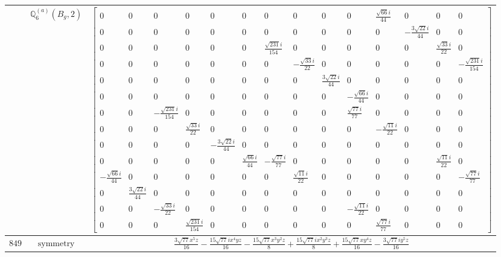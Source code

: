 \documentclass[fleqn,8pt,landscape]{jsarticle}
\begin{document}
\begin{longtable}{ccc}
$  $ & $ \mathbb{Q}_{6}^{(a)}(B_{g},2) $ & $ \begin{bmatrix} 0 & 0 & 0 & 0 & 0 & 0 & 0 & 0 & 0 & 0 & \frac{\sqrt{66} i}{44} & 0 & 0 & 0 \\ 0 & 0 & 0 & 0 & 0 & 0 & 0 & 0 & 0 & 0 & 0 & - \frac{3 \sqrt{22} i}{44} & 0 & 0 \\ 0 & 0 & 0 & 0 & 0 & 0 & \frac{\sqrt{231} i}{154} & 0 & 0 & 0 & 0 & 0 & \frac{\sqrt{33} i}{22} & 0 \\ 0 & 0 & 0 & 0 & 0 & 0 & 0 & - \frac{\sqrt{33} i}{22} & 0 & 0 & 0 & 0 & 0 & - \frac{\sqrt{231} i}{154} \\ 0 & 0 & 0 & 0 & 0 & 0 & 0 & 0 & \frac{3 \sqrt{22} i}{44} & 0 & 0 & 0 & 0 & 0 \\ 0 & 0 & 0 & 0 & 0 & 0 & 0 & 0 & 0 & - \frac{\sqrt{66} i}{44} & 0 & 0 & 0 & 0 \\ 0 & 0 & - \frac{\sqrt{231} i}{154} & 0 & 0 & 0 & 0 & 0 & 0 & \frac{\sqrt{77} i}{77} & 0 & 0 & 0 & 0 \\ 0 & 0 & 0 & \frac{\sqrt{33} i}{22} & 0 & 0 & 0 & 0 & 0 & 0 & - \frac{\sqrt{11} i}{22} & 0 & 0 & 0 \\ 0 & 0 & 0 & 0 & - \frac{3 \sqrt{22} i}{44} & 0 & 0 & 0 & 0 & 0 & 0 & 0 & 0 & 0 \\ 0 & 0 & 0 & 0 & 0 & \frac{\sqrt{66} i}{44} & - \frac{\sqrt{77} i}{77} & 0 & 0 & 0 & 0 & 0 & \frac{\sqrt{11} i}{22} & 0 \\ - \frac{\sqrt{66} i}{44} & 0 & 0 & 0 & 0 & 0 & 0 & \frac{\sqrt{11} i}{22} & 0 & 0 & 0 & 0 & 0 & - \frac{\sqrt{77} i}{77} \\ 0 & \frac{3 \sqrt{22} i}{44} & 0 & 0 & 0 & 0 & 0 & 0 & 0 & 0 & 0 & 0 & 0 & 0 \\ 0 & 0 & - \frac{\sqrt{33} i}{22} & 0 & 0 & 0 & 0 & 0 & 0 & - \frac{\sqrt{11} i}{22} & 0 & 0 & 0 & 0 \\ 0 & 0 & 0 & \frac{\sqrt{231} i}{154} & 0 & 0 & 0 & 0 & 0 & 0 & \frac{\sqrt{77} i}{77} & 0 & 0 & 0 \end{bmatrix} $ \\ \hline
$ 849 $ & $ \text{symmetry} $ & $ \frac{3 \sqrt{77} x^{5} z}{16} - \frac{15 \sqrt{77} i x^{4} y z}{16} - \frac{15 \sqrt{77} x^{3} y^{2} z}{8} + \frac{15 \sqrt{77} i x^{2} y^{3} z}{8} + \frac{15 \sqrt{77} x y^{4} z}{16} - \frac{3 \sqrt{77} i y^{5} z}{16} $ \\

\end{longtable}
\end{document}
